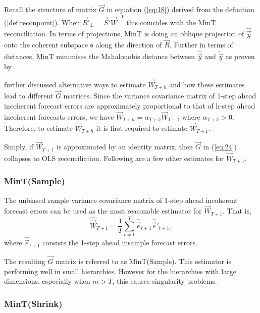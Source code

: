 \documentclass[graybox]{svmult}
\begin{document}
Recall the structure of matrix $\vec{G}$ in equation (\ref{eq:18}) derived from the definition (\ref{def:reconpoint}). When $\vec{R}'_\bot = \vec{S}'\vec{W}^{-1}$ this coincides with the MinT reconciliation. In terms of projections, MinT is doing an oblique projection of $\hat{\vec{y}}$ onto the coherent subspace $\mathfrak{s}$ along the direction of $\vec{R}$. Further in terms of distances, MinT minimises the Mahalonobis distance between $\hat{\vec{y}}$ and $\tilde{\vec{y}}$ as proven by \cite{Wickramasuriya2018}.   

\citet{Wickramasuriya2018} further discussed alternative ways to estimate ${\vec{W}}_{T+h}$ and how these estimates lead to different $\vec{G}$ matrices. Since the variance covariance matrix of 1-step ahead incoherent forecast errors are approximately proportional to that of h-step ahead incoherent forecasts errors, we have $\vec{W}_{T+h} = \alpha_{T+h}\vec{W}_{T+1}$ where $\alpha_{T+h}>0$. Therefore, to estimate ${\vec{W}}_{T+h}$ it is first required to estimate ${\vec{W}}_{T+1}$. 

Simply, if ${\vec{W}}_{T+1}$ is approximated by an identity matrix, then $\vec{G}$ in (\ref{eq:24}) collapses to OLS reconciliation. Following are a few other estimates for ${\vec{W}}_{T+1}$. 

\subsubsection{MinT(Sample)}

The unbiased sample variance covariance matrix of 1-step ahead incoherent forecast errors can be used as the most reasonable estimator for ${\vec{W}}_{T+1}$. That is, 
\begin{equation*}
\hat{\vec{W}}_{T+1} = \frac{1}{T}\sum_{t=1}^{T}\hat{\vec{e}}_{t+1}\hat{\vec{e}}'_{t+1},
\end{equation*}
where $\hat{\vec{e}}_{t+1}$ consists the 1-step ahead insample forecast errors. 


The resulting $\vec{G}$ matrix is referred to as MinT(Sample). This estimator is performing well in small hierarchies. However for the hierarchies with large dimensions, especially when $m>T$, this causes singularity problems. 

\subsubsection{MinT(Shrink)}
\end{document}
